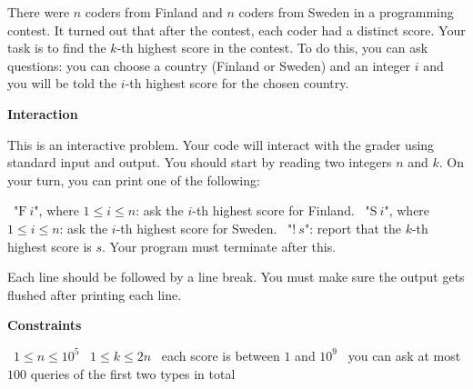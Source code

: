 There were $n$ coders from Finland and $n$ coders from Sweden in a programming contest. It turned out that after the contest, each coder had a distinct score.
Your task is to find the $k$-th highest score in the contest.
To do this, you can ask questions: you can choose a country (Finland or Sweden) and an integer $i$ and you will be told the $i$-th highest score for the chosen country.

\vspace{0.3cm}\noindent\textbf{Interaction}

This is an interactive problem. Your code will interact with the grader using standard input and output. You should start by reading two integers $n$ and $k$.
On your turn, you can print one of the following:

\textbullet\ "$\mathrm{F}\ i$", where $1 \le i \le n$: ask the $i$-th highest score for Finland.
\textbullet\ "$\mathrm{S}\ i$", where $1 \le i \le n$: ask the $i$-th highest score for Sweden.
\textbullet\ "$!\ s$": report that the $k$-th highest score is $s$. Your program must terminate after this.

Each line should be followed by a line break. You must make sure the output gets flushed after printing each line.

\vspace{0.3cm}\noindent\textbf{Constraints}

\textbullet\ $1 \le n \le 10^5$
\textbullet\ $1 \le k \le 2n$
\textbullet\ each score is between $1$ and $10^9$
\textbullet\ you can ask at most $100$ queries of the first two types in total